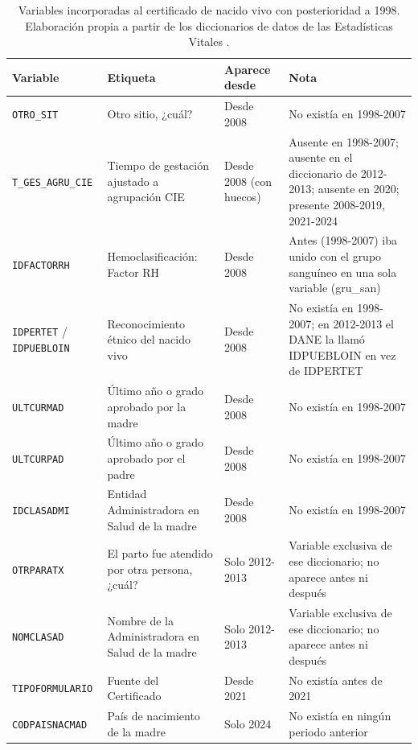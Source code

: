 \begin{table}[!htbp]
\centering
\caption[Variables incorporadas al certificado después de 1998]{Variables incorporadas al certificado de nacido vivo con posterioridad a 1998. Elaboración propia a partir de los diccionarios de datos de las Estadísticas Vitales \citep{dane2024}.}
\label{tab:vars-nuevas}
\footnotesize
\begin{tabularx}{\textwidth}{@{}p{3.4cm}p{4.2cm}p{2.9cm}X@{}}
\toprule
\textbf{Variable} & \textbf{Etiqueta} & \textbf{Aparece desde} & \textbf{Nota} \\
\midrule
\texttt{OTRO\_SIT} & Otro sitio, ¿cuál? & Desde 2008 & No existía en 1998-2007 \\
\texttt{T\_GES\_AGRU\_CIE} & Tiempo de gestación ajustado a agrupación CIE & Desde 2008 (con huecos) & Ausente en 1998-2007; ausente en el diccionario de 2012-2013; ausente en 2020; presente 2008-2019, 2021-2024 \\
\texttt{IDFACTORRH} & Hemoclasificación: Factor RH & Desde 2008 & Antes (1998-2007) iba unido con el grupo sanguíneo en una sola variable (gru\_san) \\
\texttt{IDPERTET} / \texttt{IDPUEBLOIN} & Reconocimiento étnico del nacido vivo & Desde 2008 & No existía en 1998-2007; en 2012-2013 el DANE la llamó IDPUEBLOIN en vez de IDPERTET \\
\texttt{ULTCURMAD} & Último año o grado aprobado por la madre & Desde 2008 & No existía en 1998-2007 \\
\texttt{ULTCURPAD} & Último año o grado aprobado por el padre & Desde 2008 & No existía en 1998-2007 \\
\texttt{IDCLASADMI} & Entidad Administradora en Salud de la madre & Desde 2008 & No existía en 1998-2007 \\
\texttt{OTRPARATX} & El parto fue atendido por otra persona, ¿cuál? & Solo 2012-2013 & Variable exclusiva de ese diccionario; no aparece antes ni después \\
\texttt{NOMCLASAD} & Nombre de la Administradora en Salud de la madre & Solo 2012-2013 & Variable exclusiva de ese diccionario; no aparece antes ni después \\
\texttt{TIPOFORMULARIO} & Fuente del Certificado & Desde 2021 & No existía antes de 2021 \\
\texttt{CODPAISNACMAD} & País de nacimiento de la madre & Solo 2024 & No existía en ningún periodo anterior \\
\bottomrule
\end{tabularx}
\end{table}
